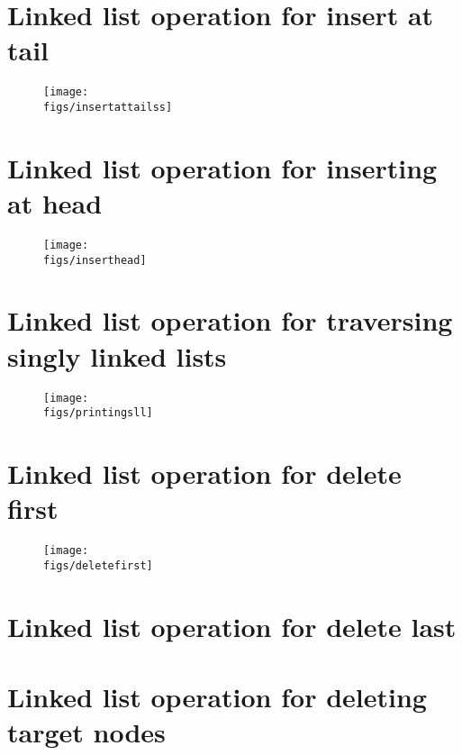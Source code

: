 \section{Linked list operation for insert at tail}
\begin{figure}[H]
    \centering
    \texttt{[image: \\figs/insertattailss]} 
\end{figure}

\section{Linked list operation for inserting at head}
\begin{figure}[H]
    \centering
    \texttt{[image: \\figs/inserthead]} 
\end{figure}
\section{Linked list operation for traversing singly linked lists}
\begin{figure}[H]
    \centering
    \texttt{[image: \\figs/printingsll]} 
\end{figure}

\section{Linked list operation for delete first}
\begin{figure}[H]
    \centering
    \texttt{[image: \\figs/deletefirst]} 
\end{figure}

\section{Linked list operation for delete last}


\section{Linked list operation for deleting target nodes}


